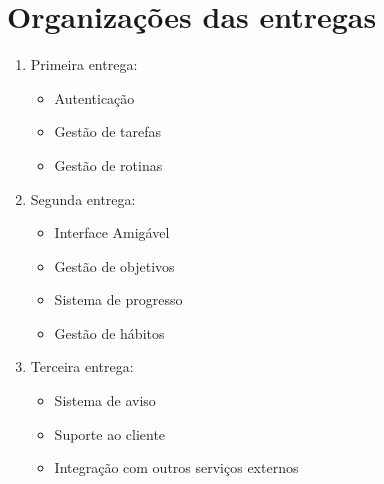 \chapter{Organizações das entregas}

\begin{enumerate}
  \item Primeira entrega:

  \begin{itemize}
    \item{Autenticação}
    \item{Gestão de tarefas}
    \item{Gestão de rotinas}
  \end{itemize}

  \item Segunda entrega:

  \begin{itemize}
    \item{Interface Amigável}
    \item{Gestão de objetivos}
    \item{Sistema de progresso}
    \item{Gestão de hábitos}
  \end{itemize}

  \item Terceira entrega:

  \begin{itemize}
    \item{Sistema de aviso}
    \item{Suporte ao cliente}
    \item{Integração com outros serviços externos}
  \end{itemize}
\end{enumerate}
